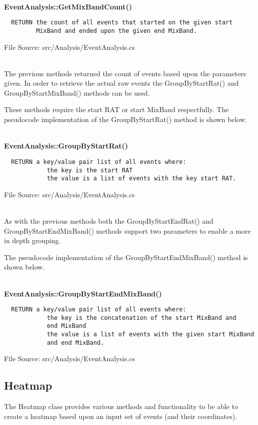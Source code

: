 ~\\
{\bfseries EventAnalysis::GetMixBandCount()}
\lstset{style=pseudocode}
\begin{lstlisting}
  RETURN the count of all events that started on the given start 
         MixBand and ended upon the given end MixBand.
\end{lstlisting}
{\textsf \footnotesize File Source: src/Analysis/EventAnalysis.cs }

~\\
The previous methods returned the count of events based upon the parameters 
given. In order to retrieve the actual raw events the 
{\ttfamily GroupByStartRat()} and {\ttfamily GroupByStartMixBand()} methods 
can be used. 

These methods require the start RAT or start MixBand respectfully. The 
pseudocode implementation of the {\ttfamily GroupByStartRat()} method is shown 
below.

~\\
{\bfseries EventAnalysis::GroupByStartRat()}
\lstset{style=pseudocode}
\begin{lstlisting}
  RETURN a key/value pair list of all events where:
            the key is the start RAT 
            the value is a list of events with the key start RAT.
\end{lstlisting}
{\textsf \footnotesize File Source: src/Analysis/EventAnalysis.cs }

~\\
As with the previous methods both the {\ttfamily GroupByStartEndRat()} and 
{\ttfamily GroupByStartEndMixBand()} methods support two parameters to enable
a more in depth grouping.

The pseudocode implementation of the {\ttfamily GroupByStartEndMixBand()} 
method is shown below.

~\\
{\bfseries EventAnalysis::GroupByStartEndMixBand()}
\lstset{style=pseudocode}
\begin{lstlisting}
  RETURN a key/value pair list of all events where:
            the key is the concatenation of the start MixBand and 
            end MixBand
            the value is a list of events with the given start MixBand 
            and end MixBand.
\end{lstlisting}
{\textsf \footnotesize File Source: src/Analysis/EventAnalysis.cs }


\subsection{Heatmap}
The Heatmap class provides various methods and functionality to be able to 
create a heatmap based upon an input set of events (and their coordinates).

